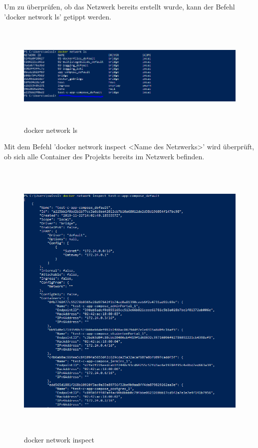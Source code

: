 \documentclass[a4paper,12pt,oneside]{book}
\begin{document}
Um zu überprüfen, ob das Netzwerk bereits erstellt wurde, kann der Befehl 'docker network ls' getippt werden.
\newline
\begin{figure}[h!]
	\begin{center}
		\includegraphics[width=17cm, height=5cm]{docker-network-ls.PNG}
		\caption{docker network ls} 
		\label{docker network ls} 
	\end{center}
\end{figure}
\newline
Mit dem Befehl 'docker network inspect <Name des Netzwerks>' wird überprüft, ob sich alle Container des Projekts bereits im Netzwerk befinden.
\newpage
\begin{figure}[h!]
	\begin{center}
		\includegraphics[width=14cm, height=14cm]{network-inspect.PNG}
		\caption{docker network inspect} 
		\label{docker network inspect} 
	\end{center}
\end{figure}
\end{document}
